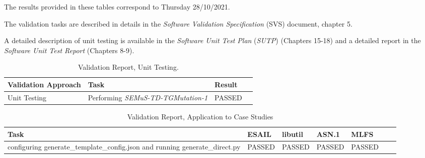
The results provided in these tables correspond to Thursday 28/10/2021.

The validation tasks are described in details in the \emph{Software Validation Specification} (SVS) document, chapter 5.

A detailed description of \SEMUS unit testing is available in the \emph{Software Unit Test Plan} (\emph{SUTP}) (Chapters 15-18) and a detailed report in the \emph{Software Unit Test Report} (Chapters 8-9).

\begin{table}[h]
\caption{\SEMUS Validation Report, Unit Testing.}
\label{table:semus:unit_results}
\scriptsize
\centering
\begin{tabular}{|l|l|l|l|}
\hline
\textbf{Validation Approach}&\textbf{Task}&\textbf{Result}\\
\hline
Unit Testing&Performing \emph{SEMuS-TD-TGMutation-1}&PASSED\\
\hline
\end{tabular}

\end{table}


\begin{table}[h]
\caption{\SEMUS Validation Report, Application to Case Studies}
\label{table:semus:results}
\scriptsize
\centering
\begin{tabular}{|l|l|l|l|l|l|l|}
\hline
\textbf{Task}&\textbf{ESAIL}&\textbf{libutil}&\textbf{ASN.1}&\textbf{MLFS}\\
\hline
configuring generate\_template\_config.json and running generate\_direct.py &PASSED&PASSED&PASSED&PASSED\\
\hline
\end{tabular}

\end{table}







\ENDCHANGEDFINAL
\clearpage
